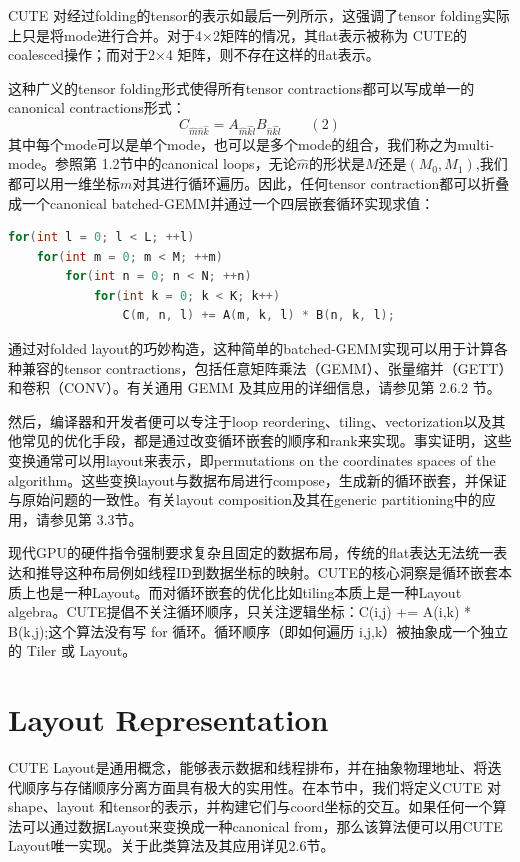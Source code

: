\documentclass{article}
\begin{document}
CUTE 对经过folding的tensor的表示如最后一列所示，这强调了tensor folding实际上只是将mode进行合并。对于4×2矩阵的情况，其flat表示被称为 CUTE的coalesced操作；而对于2×4 矩阵，则不存在这样的flat表示。

这种广义的tensor folding形式使得所有tensor contractions都可以写成单一的canonical contractions形式：
\[
C_{\hat{m}\hat{n}\hat{k}} = A_{\hat{m}\hat{k}\hat{l}} B_{\hat{n}\hat{k}\hat{l}} \qquad (2)
\]
其中每个mode可以是单个mode，也可以是多个mode的组合，我们称之为multi-mode。参照第 1.2节中的canonical loops，无论$\hat{m}$的形状是$M$还是$(M_{0}, M_{1})$,我们都可以用一维坐标$m$对其进行循环遍历。因此，任何tensor contraction都可以折叠成一个canonical batched-GEMM并通过一个四层嵌套循环实现求值：
\begin{lstlisting}[language=C++]
for(int l = 0; l < L; ++l)
    for(int m = 0; m < M; ++m)
        for(int n = 0; n < N; ++n)
            for(int k = 0; k < K; k++)
                C(m, n, l) += A(m, k, l) * B(n, k, l);
\end{lstlisting}

通过对folded layout的巧妙构造，这种简单的batched-GEMM实现可以用于计算各种兼容的tensor contractions，包括任意矩阵乘法（GEMM）、张量缩并（GETT）和卷积（CONV）。有关通用 GEMM 及其应用的详细信息，请参见第 2.6.2 节。

然后，编译器和开发者便可以专注于loop reordering、tiling、vectorization以及其他常见的优化手段，都是通过改变循环嵌套的顺序和rank来实现。事实证明，这些变换通常可以用layout来表示，即permutations on the coordinates spaces of the algorithm。这些变换layout与数据布局进行compose，生成新的循环嵌套，并保证与原始问题的一致性。有关layout composition及其在generic partitioning中的应用，请参见第 3.3节。

\begin{mycomment}
现代GPU的硬件指令强制要求复杂且固定的数据布局，传统的flat表达无法统一表达和推导这种布局例如线程ID到数据坐标的映射。CUTE的核心洞察是循环嵌套本质上也是一种Layout。而对循环嵌套的优化比如tiling本质上是一种Layout algebra。CUTE提倡不关注循环顺序，只关注逻辑坐标：C(i,j) += A(i,k) * B(k,j);这个算法没有写 for 循环。循环顺序（即如何遍历 i,j,k）被抽象成一个独立的 Tiler 或 Layout。
\end{mycomment}


\section{Layout Representation}
CUTE Layout是通用概念，能够表示数据和线程排布，并在抽象物理地址、将迭代顺序与存储顺序分离方面具有极大的实用性。在本节中，我们将定义CUTE 对shape、layout 和tensor的表示，并构建它们与coord坐标的交互。如果任何一个算法可以通过数据Layout来变换成一种canonical from，那么该算法便可以用CUTE Layout唯一实现。关于此类算法及其应用详见2.6节。
\end{document}
